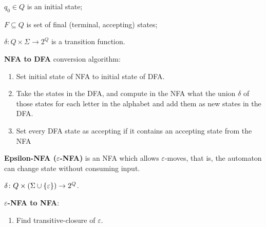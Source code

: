 \documentclass[a4paper,10pt]{article}
\begin{document}
\begin{terms}
\begin{terms}
        \item $q_0 \in Q$ is an initial state;

        \item $F \subseteq Q$ is set of final (terminal, accepting) states;

        \item $\delta: Q \times \Sigma \to 2^Q$ is a transition function.

    \end{terms}


    \item \textbf{NFA to DFA} conversion algorithm:

    \begin{enumerate}
        \item Set initial state of NFA to initial state of DFA.

        \item Take the states in the DFA, and compute in the NFA what the union $\delta$ of those states for each letter in the alphabet and add them as new states in the DFA.

        \item Set every DFA state as accepting if it contains an accepting state from the NFA
    \end{enumerate}

    \item \textbf{Epsilon-NFA ($\varepsilon$-NFA)} is an NFA which allows $\varepsilon$-moves, that is, the automaton can change state without consuming input.

    \begin{terms}
        \item $\delta \colon Q \times (\Sigma \cup \{\varepsilon\}) \to 2^Q$.
    \end{terms}

    \item \textbf{$\varepsilon$-NFA to NFA}:
    \begin{enumerate}
        \item Find transitive-closure of $\varepsilon$.


\end{enumerate}
\end{terms}
\end{document}
